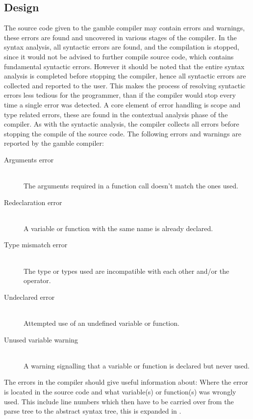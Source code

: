 \subsection*{Design}\label{subsec:DesignErrorHandling}
The source code given to the \gls{gamble} compiler may contain errors and warnings, these errors are found and uncovered in various stages of the compiler.   
In the syntax analysis, all syntactic errors are found, and the compilation is stopped, since it would not be advised to further compile source code, which contains fundamental syntactic errors.
However it should be noted that the entire syntax analysis is completed before stopping the compiler, hence all syntactic errors are collected and reported to the user.
This makes the process of resolving syntactic errors less tedious for the programmer, than if the compiler would stop every time a single error was detected. 
A core element of error handling is scope and type related errors, these are found in the contextual analysis phase of the compiler.
As with the syntactic analysis, the compiler collects all errors before stopping the compile of the source code. 
The following errors and warnings are reported by the \gls{gamble} compiler:
\begin{description}
	\item[Arguments error]\hfill\\ 
	The arguments required in a function call doesn't match the ones used.
	\item[Redeclaration error]\hfill\\ 
	A variable or function with the same name is already declared.
	\item[Type mismatch error]\hfill\\ 
	The type or types used are incompatible with each other and/or the operator. 
	\item[Undeclared error]\hfill\\ 
	Attempted use of an undefined variable or function.
	\item[Unused variable warning]\hfill\\ 
	A warning signalling that a variable or function is declared but never used.
\end{description} 
The errors in the compiler should give useful information about: Where the error is located in the source code and what variable(s) or function(s) was wrongly used.
This include line numbers which then have to be carried over from the parse tree to the abstract syntax tree, this is expanded in .

